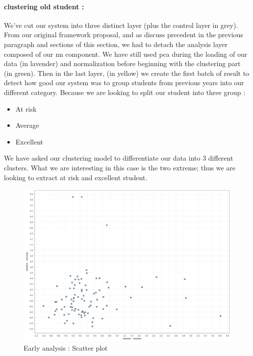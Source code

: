 \documentclass[../main.tex]{subfiles}
\begin{document}
\paragraph{clustering old student : } We've cut our system into three distinct layer (plus the control layer in grey). From our original framework proposal, and as discuss precedent in the previous paragraph and sections of this section, we had to detach the analysis layer composed of our \acrfull{nn} component. We have still used \acrfull{pca} during the loading of our data (in lavender) and normalization before beginning with the clustering part (in green). 
Then in the last layer, (in yellow) we create the first batch of result to detect how good our system was to group students from previous years into our different category. Because we are looking to split our student into three group :
\begin{itemize}
    \item At risk
    \item Average
    \item Excellent
\end{itemize}

We have asked our clustering model to differentiate our data into 3 different clusters. What we are interesting in this case is the two extreme; thus we are looking to extract at risk and excellent student. 

\begin{figure}[H]      
    \includegraphics[width=1\linewidth]{res/graph/data_analysis/imp v1/ScatterPlot_cluster2.png}
    \caption{Early analysis : Scatter plot}
    \label{fig:earlyanalysis_scatterplot_impv1}
\end{figure}
\end{document}
